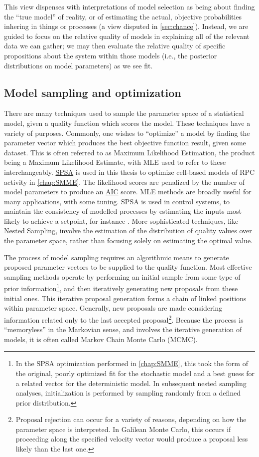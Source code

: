 \documentclass{ut-thesis}
\begin{document}
\begin{NoHyper}
This view dispenses with interpretations of model selection as being about finding the ``true model'' of reality, or of estimating the actual, objective probabilities inhering in things or processes (a view disputed in \autoref{sec:chance}). Instead, we are guided to focus on the relative quality of models in explaining all of the relevant data we can gather; we may then evaluate the relative quality of specific propositions about the system within those models (i.e., the posterior distributions on model parameters) as we see fit.  

\subsection{Model sampling and optimization}
\label{ssec:MLE}
There are many techniques used to sample the parameter space of a statistical model, given a quality function which scores the model. These techniques have a variety of purposes. Commonly, one wishes to ``optimize'' a model by finding the parameter vector which produces the best objective function result, given some dataset. This is often referred to as Maximum Likelihood Estimation, the product being a Maximum Likelihood Estimate, with MLE used to refer to these interchangeably. \hyperref[ssec:SPSA]{SPSA} is used in this thesis to optimize cell-based models of RPC activity in \autoref{chap:SMME}. The likelihood scores are penalized by the number of model parameters to produce an \hyperref[ssec:AIC]{AIC} score. MLE methods are broadly useful for many applications, with some tuning. SPSA is used in control systems, to maintain the consistency of modelled processes by estimating the inputs most likely to achieve a setpoint, for instance \cite{Zhou2008}. More sophisticated techniques, like \hyperref[ssec:nested]{Nested Sampling}, involve the estimation of the distribution of quality values over the parameter space, rather than focusing solely on estimating the optimal value.

The process of model sampling requires an algorithmic means to generate proposed parameter vectors to be supplied to the quality function. Most effective sampling methods operate by performing an initial sample from some type of prior information\footnote{In the SPSA optimization performed in \autoref{chap:SMME}, this took the form of the original, poorly optimized fit for the stochastic model and a best guess for a related vector for the deterministic model. In subsequent nested sampling analyses, initialization is performed by sampling randomly from a defined prior distribution.}, and then iteratively generating new proposals from these initial ones. This iterative proposal generation forms a chain of linked positions within parameter space. Generally, new proposals are made considering information related only to the last accepted proposal\footnote{Proposal rejection can occur for a variety of reasons, depending on how the parameter space is interpreted. In Galilean Monte Carlo, this occurs if proceeding along the specified velocity vector would produce a proposal less likely than the last one.}. Because the process is ``memoryless'' in the Markovian sense, and involves the iterative generation of models, it is often called Markov Chain Monte Carlo (MCMC).


\end{NoHyper}
\end{document}
